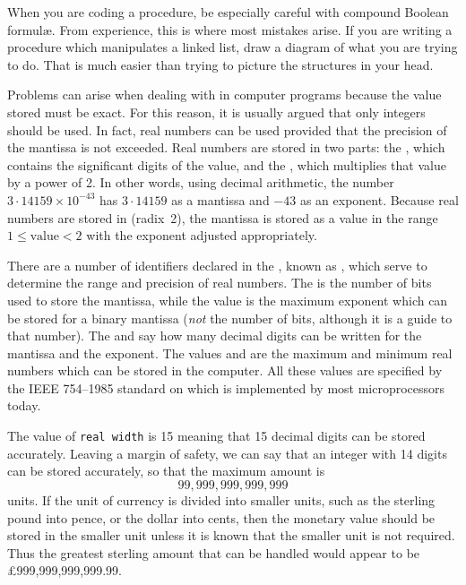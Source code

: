 When you are coding a procedure, be especially careful with compound
Boolean formul\ae. From experience, this is where most mistakes
arise. If you are writing a procedure which manipulates a linked
list, draw a diagram of what you are trying to do.  That is much
easier than trying to picture the structures in your head.

Problems can arise when dealing with  in
computer programs because the value stored must be exact.  For this
reason, it is usually argued that only integers should be used.  In
fact, real numbers can be used provided that the precision of the
mantissa is not exceeded.  Real numbers are stored in two parts: the
, which contains the significant digits of the value,
and the , which multiplies that value by a power of 2.
In other words, using decimal arithmetic, the number
$3\cdot14159\times10^{-43}$ has $3\cdot14159$ as a mantissa and $-43$
as an exponent.  Because real numbers are stored in 
(radix~2), the mantissa is stored as a value in the range
$1\le\textrm{value}<2$ with the exponent adjusted appropriately.

There are a number of identifiers declared in the , known as
, which serve
to determine the range and precision of real numbers.  The
 is the number of bits used to store the
mantissa, while the value  is the maximum exponent
which can be stored for a binary mantissa ({\it not\/} the number of
bits, although it is a guide to that number).  The 
and  say how many decimal digits can be written for
the mantissa and the exponent.  The values  and
 are the maximum and minimum real numbers which can be
stored in the computer.  All these values are specified by the IEEE
754--1985 standard on
which is implemented by most microprocessors today.

The value of \verb|real width| is 15 meaning that 15 decimal digits can be
stored accurately. Leaving a margin of safety, we can say that an integer
with 14 digits can be stored accurately, so that the maximum amount is
$$99,999,999,999,999$$
units. If the unit of currency is divided into
smaller units, such as the sterling pound into pence, or the dollar into
cents, then the monetary value should be stored in the smaller unit unless
it is known that the smaller unit is not required. Thus the greatest
sterling amount that can be handled would appear to be
\pounds 999,999,999,999.99.


